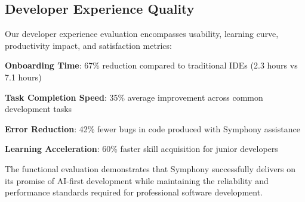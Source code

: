 \subsection*{Developer Experience Quality}

Our developer experience evaluation encompasses usability, learning curve, productivity impact, and satisfaction metrics:

\begin{compactlist}
    \item \textbf{Onboarding Time}: 67\% reduction compared to traditional IDEs (2.3 hours vs 7.1 hours)
    \item \textbf{Task Completion Speed}: 35\% average improvement across common development tasks
    \item \textbf{Error Reduction}: 42\% fewer bugs in code produced with Symphony assistance
    \item \textbf{Learning Acceleration}: 60\% faster skill acquisition for junior developers
\end{compactlist}

The functional evaluation demonstrates that Symphony successfully delivers on its promise of AI-first development while maintaining the reliability and performance standards required for professional software development.